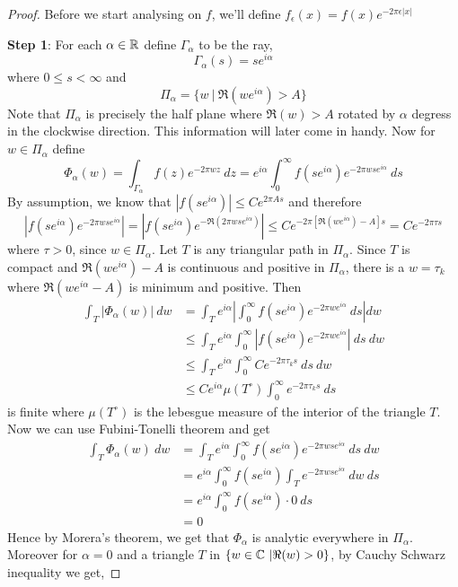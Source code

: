 \begin{proof}
  Before we start analysing on $f$, we'll define $f_\epsilon(x) = f(x)e^{-2\pi \epsilon |x|}$

  \textbf{Step 1}: For each $\alpha \in \mathbb R$ define $\Gamma_\alpha$ to be the ray, $$\Gamma_\alpha(s) = se^{i\alpha}$$
  where $0\le s <\infty$ and $$\Pi_\alpha = \{w\ | \ \Re(we^{i\alpha}) > A\}$$
  Note that $\Pi_\alpha$ is precisely the half plane where $\Re(w) > A$ rotated by $\alpha$ degress in the clockwise direction. This information will later come in handy. Now for $w \in \Pi_\alpha$ define $$ \Phi_\alpha(w) = \int_{\Gamma_\alpha} f(z) e^{-2\pi wz} \ dz = e^{i\alpha}\int_0^\infty f(se^{i\alpha})e^{-2\pi wse^{i\alpha}} \ ds$$
  By assumption, we know that $\left|f(se^{i\alpha})\right| \le Ce^{2\pi As}$ and therefore $$\left|f(se^{i\alpha})e^{-2\pi wse^{i\alpha}}\right| = \left|f(se^{i\alpha})e^{-\Re(2\pi wse^{i\alpha})}\right| \le Ce^{-2\pi[\Re(we^{i\alpha}) - A]s} = Ce^{-2\pi \tau s}$$
  where $\tau > 0$, since $w \in \Pi_\alpha$. Let $T$ is any triangular path in $\Pi_\alpha$. Since $T$ is compact and $\Re(we^{i\alpha})-A$ is continuous and positive in $\Pi_\alpha$, there is a $w = \tau_k$ where $\Re(we^{i\alpha} - A)$ is minimum and positive. Then 
  \begin{align*}
    \int_T\left|\Phi_\alpha(w)\right| \ dw &= \int_T e^{i\alpha} \left|\int_0^\infty f(se^{i\alpha}) e^{-2\pi we^{i\alpha}} \ ds \right| dw \\
      & \le \int_T e^{i\alpha} \int_0^\infty \left|f(se^{i\alpha}) e^{-2\pi we^{i\alpha}} \right| \ ds \ dw \\
      & \le \int_T e^{i\alpha} \int_0^\infty Ce^{-2\pi \tau_k s} \ ds \ dw \\
      & \le Ce^{i\alpha} \mu(T^\circ) \int_0^\infty e^{-2\pi \tau_k s} \ ds
  \end{align*}
  is finite where $\mu(T^\circ)$ is the lebesgue measure of the interior of the triangle $T$. 
  Now we can use Fubini-Tonelli theorem and get
  \begin{align*}
    \int_T \Phi_\alpha(w) \ dw &= \int_T e^{i\alpha} \int_0^\infty f(se^{i\alpha}) e^{-2\pi w s e^{i\alpha}} \ ds \ dw \\
    & = e^{i\alpha}\int_0^\infty f(se^{i\alpha}) \int_T e^{-2\pi wse^{i\alpha}} \ dw \ ds \\
    & = e^{i\alpha} \int_0^\infty f(se^{i\alpha}) \cdot 0 \ ds \\
    & = 0
  \end{align*}
  Hence by Morera's theorem, we get that $\Phi_\alpha$ is analytic everywhere in $\Pi_\alpha$. Moreover for $\alpha = 0$ and a triangle $T$ in $\{w \in \mathbb C \ | \Re(w) > 0 \}$, by Cauchy Schwarz inequality we get,

\end{proof}
